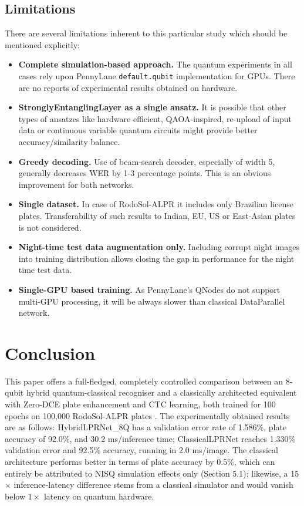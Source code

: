 \documentclass{ieeeaccess}
\begin{document}
\subsection{Limitations}
There are several limitations inherent to this particular study which should be mentioned explicitly:
\begin{itemize}
\item \textbf{Complete simulation-based approach.} The quantum experiments in all cases rely upon PennyLane \texttt{default.qubit} implementation for GPUs. There are no reports of experimental results obtained on hardware.
\item \textbf{StronglyEntanglingLayer as a single ansatz.} It is possible that other types of ansatzes like hardware efficient, QAOA-inspired, re-upload of input data \cite{b40} or continuous variable quantum circuits \cite{b39} might provide better accuracy/similarity balance.
\item \textbf{Greedy decoding.} Use of beam-search decoder, especially of width 5, generally decreases WER by 1-3 percentage points. This is an obvious improvement for both networks.
\item \textbf{Single dataset.} In case of RodoSol-ALPR it includes only Brazilian license plates. Transferability of such results to Indian, EU, US or East-Asian plates is not considered.
\item \textbf{Night-time test data augmentation only.} Including corrupt night images into training distribution allows closing the gap in performance for the night time test data.
\item \textbf{Single-GPU based training.} As PennyLane's QNodes do not support multi-GPU processing, it will be always slower than classical DataParallel network.
\end{itemize}

\section{Conclusion}
This paper offers a full-fledged, completely controlled comparison between an 8-qubit hybrid quantum-classical recogniser and a classically architected equivalent with Zero-DCE \cite{b2} plate enhancement and CTC \cite{b3} learning, both trained for 100 epochs on 100,000 RodoSol-ALPR plates \cite{b6}. The experimentally obtained results are as follows: HybridLPRNet\_8Q has a validation error rate of 1.586\%, plate accuracy of 92.0\%, and 30.2 ms/inference time; ClassicalLPRNet reaches 1.330\% validation error and 92.5\% accuracy, running in 2.0 ms/image. The classical architecture performs better in terms of plate accuracy by 0.5\%, which can entirely be attributed to NISQ simulation effects only (Section 5.1); likewise, a 15$\times$ inference-latency difference stems from a classical simulator and would vanish below $1\times$ latency on quantum hardware.
\end{document}
